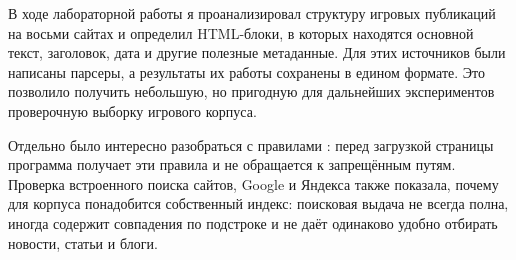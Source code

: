 \documentclass[12pt,a4paper]{article}
\newcommand{\code}[1]{\texttt{\detokenize{#1}}}
\begin{document}
В ходе лабораторной работы я проанализировал структуру игровых публикаций на
восьми сайтах и определил HTML-блоки, в которых находятся основной текст,
заголовок, дата и другие полезные метаданные. Для этих источников были
написаны парсеры, а результаты их работы сохранены в едином формате. Это
позволило получить небольшую, но пригодную для дальнейших экспериментов
проверочную выборку игрового корпуса.

Отдельно было интересно разобраться с правилами \code{robots.txt}: перед
загрузкой страницы программа получает эти правила и не обращается к
запрещённым путям. Проверка встроенного поиска сайтов, Google и Яндекса также
показала, почему для корпуса понадобится собственный индекс: поисковая выдача
не всегда полна, иногда содержит совпадения по подстроке и не даёт одинаково
удобно отбирать новости, статьи и блоги.
\end{document}
